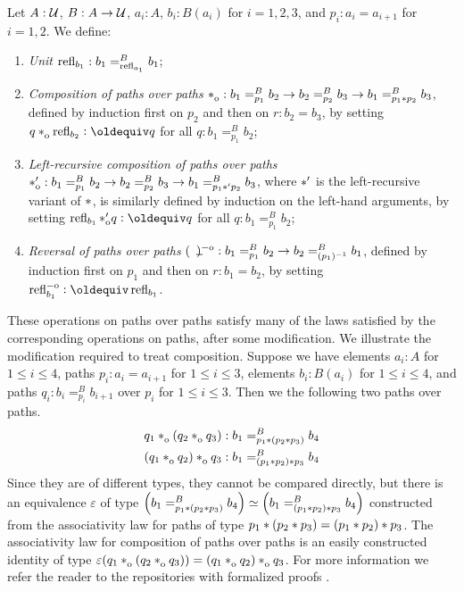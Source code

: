 \documentclass[a4paper,12pt]{amsart}
\begin{document}
\begin{definition}\label{def:pathoveralgebra}
  Let $A : \mathcal{U}$, $B : A \to \mathcal{U}$, $a_i:A$, $b_i:B(a_i)$ for $i=1,2,3$, and
  $p_i : a_i = a_{i+1}$ for $i=1,2$. We define:
  \begin{enumerate}[topsep=3pt]
  \item \emph{Unit} $\mathop{{\mathrm{refl}}_{b_1}} : b_1 =^B_{\mathop{{\mathrm{refl}}_{a_1}}} b_1$;
  \item \emph{Composition of paths over paths}
    $\cto : b_1 =^B_{p_1} b_2 \to b_2 =^B_{p_2} b_3 \to b_1 =^B_{p_1 \ct p_2} b_3$,
    defined by induction first on $p_2$ and then on $r: b_2 = b_3$, by
    setting $q \cto \reflo{b_2} \defeq q$ for all $q: b_1 =^B_{p_1} b_2$;
  \item \emph{Left-recursive composition of paths over paths}
    $*_{\mathrm{o}}^\prime : b_1 =^B_{p_1} b_2 \to b_2 =^B_{p_2} b_3 \to b_1 =^B_{p_1 *' p_2} b_3$,
    where $*'$ is the left-recursive variant of $*$,
    is similarly defined by induction on the left-hand arguments, by setting
    $\reflo{b_1} \ctop q \defeq q$ for all $q: b_1 =^B_{p_1} b_2$;
  \item \emph{Reversal of paths over paths}
    $(\blank)\invo : b_1 =^B_{p_1} b_2 \to b_2 =^B_{(p_1)^{-1}} b_1$,
    defined by induction first on $p_1$ and then on $r: b_1 = b_2$, by
    setting $\refloi{b_1} \defeq \refl{b_1}$.
  \end{enumerate}
\end{definition}

These operations on paths over paths satisfy many of the laws satisfied by the corresponding operations on paths, after some modification.  We
illustrate the modification required to treat composition.  Suppose we have elements $a_i : A$ for $1 \le i \le 4$, paths $p_i : a_i = a_{i+1}$
for $1 \le i \le 3$, elements $b_i:B(a_i)$ for $1 \le i \le 4$, and paths $q_i : b_i =^B_{p_i} b_{i+1}$ over $p_i$ for $1 \le i \le 3$.
Then we the following two paths over paths.
\begin{align*}
   q_1 \cto (q_2 \cto q_3) & : b_1 =^B_{p_1\ct (p_2\ct p_3)} b_4 \\
  (q_1 \cto q_2) \cto q_3  & : b_1 =^B_{(p_1\ct p_2) \ct p_3} b_4
\end{align*}
Since they are of different types, they cannot be compared directly, but there is an
equivalence $\varepsilon$ of type $\left( b_1 =^B_{p_1* (p_2* p_3)} b_4 \right) \simeq \left( b_1 =^B_{(p_1* p_2) * p_3} b_4 \right)$
constructed from the associativity law for paths of type $p_1*(p_2* p_3) = (p_1* p_2)* p_3$.
The associativity law for composition of paths over paths is an easily constructed identity of type $\varepsilon(q_1 \cto (q_2 \cto q_3)) = (q_1 \cto q_2)\cto q_3$.
For more information we refer the reader to the repositories with formalized proofs
\cite[\href{https://github.com/UniMath/UniMath/blob/master/UniMath/SyntheticHomotopyTheory/Circle2.v}{Circle2.v}]{UniMath}.
\end{document}
